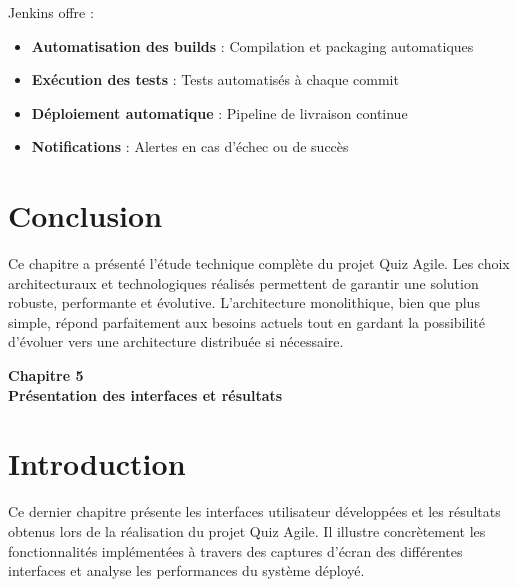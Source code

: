\documentclass[12pt,a4paper]{report}
\begin{document}
Jenkins offre :
\begin{itemize}
    \item \textbf{Automatisation des builds} : Compilation et packaging automatiques
    \item \textbf{Exécution des tests} : Tests automatisés à chaque commit
    \item \textbf{Déploiement automatique} : Pipeline de livraison continue
    \item \textbf{Notifications} : Alertes en cas d'échec ou de succès
\end{itemize}

\section{Conclusion}

Ce chapitre a présenté l'étude technique complète du projet Quiz Agile. Les choix architecturaux et technologiques réalisés permettent de garantir une solution robuste, performante et évolutive. L'architecture monolithique, bien que plus simple, répond parfaitement aux besoins actuels tout en gardant la possibilité d'évoluer vers une architecture distribuée si nécessaire.


\cleardoublepage
\thispagestyle{empty}
\begin{center}
    \vspace*{4cm}
    {\Huge \textbf{Chapitre 5}}\\[1.5cm]
    {\LARGE \textbf{Présentation des interfaces et résultats}}
\end{center}
\cleardoublepage

\setcounter{section}{0}

\section{Introduction}

Ce dernier chapitre présente les interfaces utilisateur développées et les résultats obtenus lors de la réalisation du projet Quiz Agile. Il illustre concrètement les fonctionnalités implémentées à travers des captures d'écran des différentes interfaces et analyse les performances du système déployé.
\end{document}
